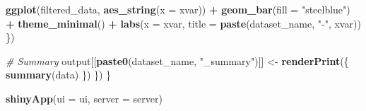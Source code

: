 \documentclass[
]{article}
\newenvironment{Shaded}{\begin{snugshade}}{\end{snugshade}}
\newcommand{\AttributeTok}[1]{\textcolor[rgb]{0.13,0.29,0.53}{#1}}
\newcommand{\CommentTok}[1]{\textcolor[rgb]{0.56,0.35,0.01}{\textit{#1}}}
\newcommand{\FunctionTok}[1]{\textcolor[rgb]{0.13,0.29,0.53}{\textbf{#1}}}
\newcommand{\NormalTok}[1]{#1}
\newcommand{\OtherTok}[1]{\textcolor[rgb]{0.56,0.35,0.01}{#1}}
\newcommand{\SpecialCharTok}[1]{\textcolor[rgb]{0.81,0.36,0.00}{\textbf{#1}}}
\newcommand{\StringTok}[1]{\textcolor[rgb]{0.31,0.60,0.02}{#1}}
\begin{document}
\begin{Shaded}
\begin{Highlighting}[]
      \FunctionTok{ggplot}\NormalTok{(filtered\_data, }\FunctionTok{aes\_string}\NormalTok{(}\AttributeTok{x =}\NormalTok{ xvar)) }\SpecialCharTok{+}
        \FunctionTok{geom\_bar}\NormalTok{(}\AttributeTok{fill =} \StringTok{"steelblue"}\NormalTok{) }\SpecialCharTok{+}
        \FunctionTok{theme\_minimal}\NormalTok{() }\SpecialCharTok{+}
        \FunctionTok{labs}\NormalTok{(}\AttributeTok{x =}\NormalTok{ xvar, }\AttributeTok{title =} \FunctionTok{paste}\NormalTok{(dataset\_name, }\StringTok{"{-}"}\NormalTok{, xvar))}
\NormalTok{    \})}
    
    \CommentTok{\# Summary}
\NormalTok{    output[[}\FunctionTok{paste0}\NormalTok{(dataset\_name, }\StringTok{"\_summary"}\NormalTok{)]] }\OtherTok{\textless{}{-}} \FunctionTok{renderPrint}\NormalTok{(\{}
      \FunctionTok{summary}\NormalTok{(data)}
\NormalTok{    \})}
\NormalTok{  \})}
\NormalTok{\}}

\FunctionTok{shinyApp}\NormalTok{(}\AttributeTok{ui =}\NormalTok{ ui, }\AttributeTok{server =}\NormalTok{ server)}
\end{Highlighting}
\end{Shaded}
\end{document}
